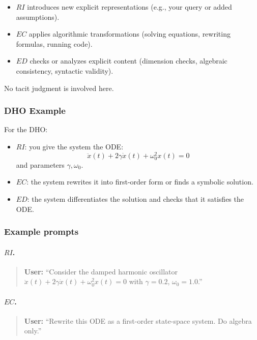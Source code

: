 \begin{itemize}
 \item $RI$ introduces new explicit representations (e.g., your query or added assumptions).
 \item $EC$ applies algorithmic transformations (solving equations, rewriting formulas, running code).
 \item $ED$ checks or analyzes explicit content (dimension checks, algebraic consistency, syntactic
 validity).
\end{itemize}

No tacit judgment is involved here.

\subsubsection*{DHO Example}

For the DHO:

\begin{itemize}
 \item $RI$: you give the system the ODE:
 \[
 \ddot{x}(t) + 2\gamma \dot{x}(t) + \omega_0^2 x(t) = 0
 \]
 and parameters $\gamma, \omega_0$.
 \item $EC$: the system rewrites it into first-order form or finds a symbolic solution.
 \item $ED$: the system differentiates the solution and checks that it satisfies the ODE.
\end{itemize}

\subsubsection*{Example prompts}

\paragraph{$RI$.}
\begin{quote}
\textbf{User:} 
``Consider the damped harmonic oscillator
$\ddot{x}(t) + 2\gamma \dot{x}(t) + \omega_0^2 x(t) = 0$ with $\gamma = 0.2$, $\omega_0 = 1.0$.'' 
\end{quote}

\paragraph{$EC$.}
\begin{quote}
\textbf{User:} 
``Rewrite this ODE as a first-order state-space system. Do algebra only.'' 
\end{quote}

